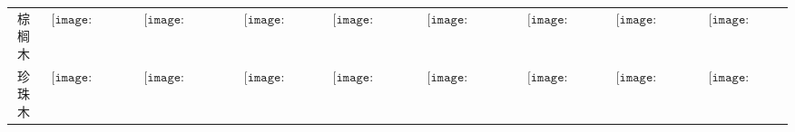 \begin{longtable}{|c|cccccccc|}
棕榈木&$\begin{array}{c}\texttt{[image: figures/Palm\_Wood\_Candle.png]}\end{array}$&$\begin{array}{c}\texttt{[image: figures/Palm\_Wood\_Candelabra.png]}\end{array}$&$\begin{array}{c}\texttt{[image: figures/Palm\_Wood\_Lamp.png]}\end{array}$&$\begin{array}{c}\texttt{[image: figures/Palm\_Wood\_Lantern.png]}\end{array}$&$\begin{array}{c}\texttt{[image: figures/Palm\_Wood\_Chandelier.png]}\end{array}$&$\begin{array}{c}\texttt{[image: figures/Palm\_Wood\_Door.png]}\end{array}$&$\begin{array}{c}\texttt{[image: figures/Palm\_Wood\_Toilet.png]}\end{array}$&$\begin{array}{c}\texttt{[image: figures/Palm\_Wood\_Chest.png]}\end{array}$\\
珍珠木&$\begin{array}{c}\texttt{[image: figures/Pearlwood\_Candle.png]}\end{array}$&$\begin{array}{c}\texttt{[image: figures/Pearlwood\_Candelabra.png]}\end{array}$&$\begin{array}{c}\texttt{[image: figures/Pearlwood\_Lamp.png]}\end{array}$&$\begin{array}{c}\texttt{[image: figures/Pearlwood\_Lantern.png]}\end{array}$&$\begin{array}{c}\texttt{[image: figures/Pearlwood\_Chandelier.png]}\end{array}$&$\begin{array}{c}\texttt{[image: figures/Pearlwood\_Door.png]}\end{array}$&$\begin{array}{c}\texttt{[image: figures/Pearlwood\_Toilet.png]}\end{array}$&$\begin{array}{c}\texttt{[image: figures/Pearlwood\_Chest.png]}\end{array}$\\

\end{longtable}
